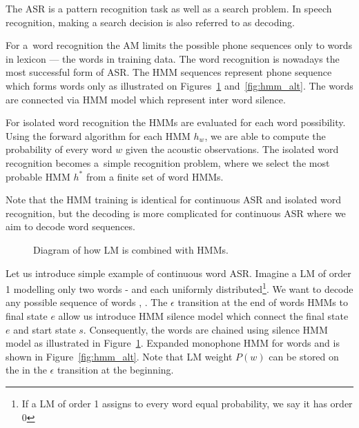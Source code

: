 The \ac{ASR} is a pattern recognition task as well as a search problem.
In speech recognition, making a search decision is also referred to as decoding.\cite{huang2001spoken}

For a~word recognition the \ac{AM} limits the possible phone sequences only to words in lexicon --- the words in training data.
The word recognition is nowadays the most successful form of \ac{ASR}.
The \ac{HMM} sequences represent phone sequence which forms words only as illustrated on Figures~\ref{fig:hmm_lm} and~\ref{fig:hmm_alt}.
The words are connected via \ac{HMM} model which represent inter word silence.

For isolated word recognition the \acp{HMM} are evaluated for each word possibility.
Using the forward algorithm for each \ac{HMM} $h_w$, we are able to compute the probability of every word $w$ given the acoustic observations.
The isolated word recognition becomes a~simple recognition problem, where we select the most probable \ac{HMM} $h^*$ from a finite set of word \acp{HMM}.

Note that the \ac{HMM} training is identical for continuous \ac{ASR} and isolated word recognition,
but the decoding is more complicated for continuous \ac{ASR} where we aim to decode word sequences.

\begin{figure}[!htp]
    \begin{center}
        
        \caption{Diagram of how \ac{LM} is combined with \acp{HMM}.}
        \label{fig:hmm_lm} 
    \end{center}
\end{figure}

Let us introduce simple example of continuous word \ac{ASR}.
Imagine a \ac{LM} of order 1 modelling only two words -  and  each uniformly distributed\footnote{If a \ac{LM} of order 1 assigns to every word equal probability, we say it has order 0}.
We want to decode any possible sequence of words , . 
The $\epsilon$ transition at the end of words \acp{HMM} to final state $e$ allow us introduce \ac{HMM} silence model which connect the final state $e$ and start state $s$. 
Consequently, the words are chained using silence \ac{HMM} model as illustrated in Figure~\ref{fig:hmm_lm}.
Expanded monophone \ac{HMM} for words  and  is shown in Figure~\ref{fig:hmm_alt}.
Note that \ac{LM} weight $P(w)$ can be stored on the in the $\epsilon$ transition at the beginning.


